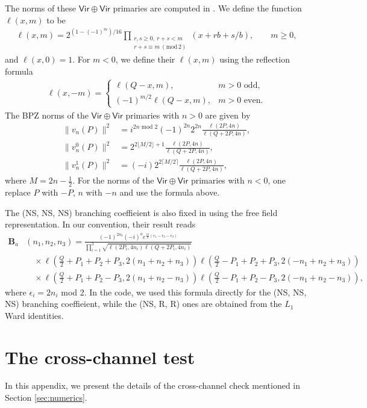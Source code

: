 \documentclass[12pt]{article}
\def\ie{\begin{equation}\begin{aligned}}
\def\fe{\end{aligned}\end{equation}}
\begin{document}
\begin{appendix}
The norms of these $\mathsf{Vir}\oplus \mathsf{Vir}$ primaries are computed in \cite{Hadasz:2013dza}. We define the function $\ell(x,m)$ to be
\ie
 \ell(x,m)=2^{(1-(-1)^m)/16}
 \prod_{\substack{r,s\ge0,\ r+s<m\\r+s\equiv m\ (\mathrm{mod}\,2)}}
 (x+rb+s/b),\qquad m\ge0,
\fe
and $\ell(x,0)=1$. For $m<0$, we define their $\ell(x,m)$ using the reflection formula
\ie
 \ell(x,-m)=
 \begin{cases}
 \ell(Q-x,m),&m>0\text{ odd},\\
 (-1)^{m/2}\ell(Q-x,m),&m>0\text{ even}.
 \end{cases}
\fe
The BPZ norms of the $\mathsf{Vir}\oplus \mathsf{Vir}$ primaries with $n>0$ are given by
\ie
\|v_n(P)\|^2 &= i^{2n\text{ mod }2}(-1)^{2n} 2^{2n} \frac{\ell(2P,4n)}{\ell(Q+2P, 4n)},\\
\|v_n^0(P)\|^2&=2^{2\lfloor M/2\rfloor+1}
               \frac{\ell(2P,4n)}{\ell(Q+2P,4n)},\\
 \|v_n^1(P)\|^2&=(-i)2^{2\lceil M/2\rceil}
               \frac{\ell(2P,4n)}{\ell(Q+2P,4n)},
\fe
where $M = 2n-\frac{1}{2}$. For the norms of the $\mathsf{Vir}\oplus \mathsf{Vir}$ primaries with $n<0$, one replace $P$ with $-P$, $n$ with $-n$ and use the formula above.

The (NS, NS, NS) branching coeffieient is also fixed in \cite{Hadasz:2013dza} using the free field representation. In our convention, their result reads
\ie
\mathbf{B}_a&(n_1, n_2, n_3) = \frac{(-1)^{2n_3}(-i)^ae^{\frac{i\pi}{4}(\epsilon_1-\epsilon_2-\epsilon_3)}}{\prod_{i=1}^3\sqrt{\ell(2P_i, 4n_i)\ell(Q+2P_i, 4n_i)}}\\
&\quad \times \ell\left(\tfrac{Q}{2}+P_1+P_2+P_3, 2(n_1+n_2+n_3)\right)\ell\left(\tfrac{Q}{2}-P_1+P_2+P_3, 2(-n_1+n_2+n_3)\right)\\
&\quad \times \ell\left(\tfrac{Q}{2}+P_1+P_2-P_3, 2(n_1+n_2-n_3)\right) \ell\left(\tfrac{Q}{2}-P_1+P_2-P_3, 2(-n_1+n_2-n_3)\right),
\fe
where $\epsilon_i = 2n_i$ mod 2. In the code, we used this formula directly for the (NS, NS, NS) branching coeffieient, while the (NS, R, R) ones are obtained from the $L_1$ Ward identities.

\section{The cross-channel test}

\label{app:Zratiocheck}

In this appendix, we present the details of the cross-channel check mentioned in Section \ref{sec:numerics}. 


\end{appendix}
\end{document}
